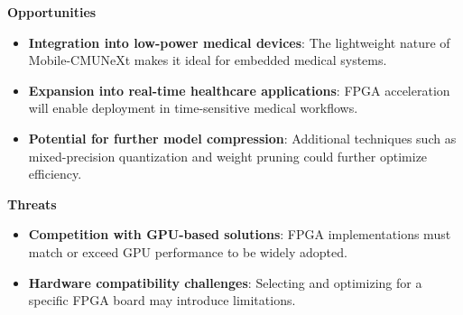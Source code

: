 \begin{tcolorbox}[colframe=black, colback=white, sharp corners, boxrule=1pt, width=\textwidth]
    \begin{minipage}{0.48\textwidth}
        \textbf{Opportunities}
        \begin{itemize}
            \item \textbf{Integration into low-power medical devices}: The lightweight nature of Mobile-CMUNeXt makes it ideal for embedded medical systems.
            \item \textbf{Expansion into real-time healthcare applications}: FPGA acceleration will enable deployment in time-sensitive medical workflows.
            \item \textbf{Potential for further model compression}: Additional techniques such as mixed-precision quantization and weight pruning could further optimize efficiency.
        \end{itemize}
    \end{minipage}
    \hfill
    \begin{minipage}{0.48\textwidth}
        \textbf{Threats}
        \begin{itemize}
            \item \textbf{Competition with GPU-based solutions}: FPGA implementations must match or exceed GPU performance to be widely adopted.
            \item \textbf{Hardware compatibility challenges}: Selecting and optimizing for a specific FPGA board may introduce limitations.
        \end{itemize}
    \end{minipage}
\end{tcolorbox}